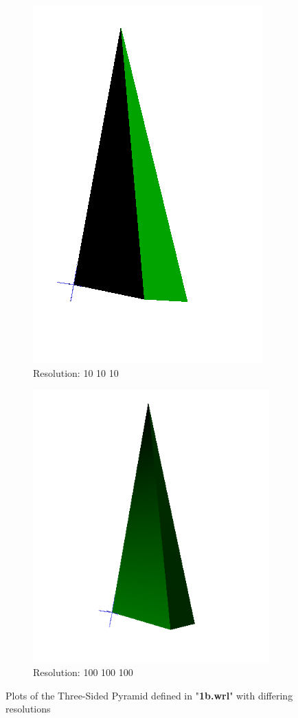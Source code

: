 \documentclass[acmlarge,nonacm=true]{acmart}
\begin{document}
\begin{figure}[H]
\begin{subfigure}{.33\textwidth}
	  \includegraphics[width=.8\linewidth]{fig/1b10_10_10}
	  \caption{Resolution: 10 10 10}
	\end{subfigure}
	\begin{subfigure}{.33\textwidth}
		\centering
		\includegraphics[width=.8\linewidth]{fig/1b100_100_100}
		\caption{Resolution: 100 100 100}
	  \end{subfigure}
	\caption{Plots of the Three-Sided Pyramid defined in "\textbf{1b.wrl}" with differing resolutions}
	\label{fig:1b}
\end{figure}
\end{document}
